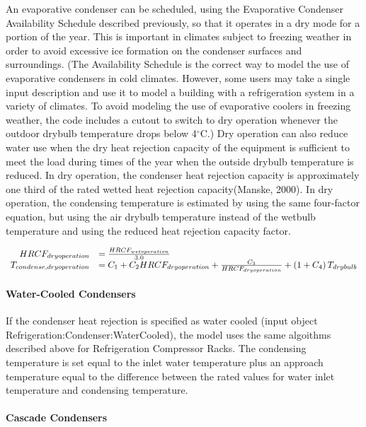 An evaporative condenser can be scheduled, using the Evaporative Condenser Availability Schedule described previously, so that it operates in a dry mode for a portion of the year. This is important in climates subject to freezing weather in order to avoid excessive ice formation on the condenser surfaces and surroundings. (The Availability Schedule is the correct way to model the use of evaporative condensers in cold climates. However, some users may take a single input description and use it to model a building with a refrigeration system in a variety of climates. To avoid modeling the use of evaporative coolers in freezing weather, the code includes a cutout to switch to dry operation whenever the outdoor drybulb temperature drops below 4\(^{\circ}\)C.) Dry operation can also reduce water use when the dry heat rejection capacity of the equipment is sufficient to meet the load during times of the year when the outside drybulb temperature is reduced. In dry operation, the condenser heat rejection capacity is approximately one third of the rated wetted heat rejection capacity(Manske, 2000). In dry operation, the condensing temperature is estimated by using the same four-factor equation, but using the air drybulb temperature instead of the wetbulb temperature and using the reduced heat rejection capacity factor.

\begin{equation}
  \begin{array}{rl}
    HRCF_{dry operation} &= \frac{HRCF_{wet operation}}{3.0} \\
    T_{condense,dry operation} &= {C_1} + {C_2}{HRCF_{dry operation}} + \frac{C_3}{HRCF_{dry operation}} + \left(1 + C_4\right) T_{drybulb}
  \end{array}
\end{equation}

\paragraph{Water-Cooled Condensers}\label{water-cooled-condensers}

If the condenser heat rejection is specified as water cooled (input object Refrigeration:Condenser:WaterCooled), the model uses the same algoithms described above for Refrigeration Compressor Racks. The condensing temperature is set equal to the inlet water temperature plus an approach temperature equal to the difference between the rated values for water inlet temperature and condensing temperature.

\paragraph{Cascade Condensers}\label{cascade-condensers}

